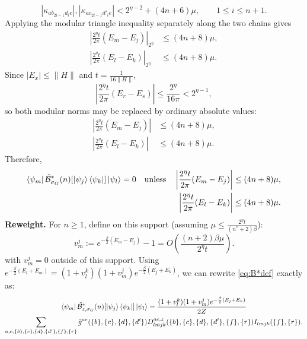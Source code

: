 \documentclass[aps,floatfix,10pt,amssymb,amsfont,amsmath,superscriptaddress,float,nofootinbib,longbibliography,nobalancelastpage,twocolumn]{revtex4-2}
\begin{document}
\begin{equation}
    |\kappa_{ab_{2i-1}d_i e}|,|\kappa_{ac_{2i-1}d'_i e}| < 2^{\eta-2}+(4n+6)\mu,
    \qquad 1\leq i\leq n+1.
    \label{eq:Qkappabound}
\end{equation}
Applying the modular triangle inequality separately along the two chains gives
\begin{equation}
\begin{aligned}
    \left|\frac{2^{\eta}t}{2\pi}(E_m-E_j)\right|_{2^{\eta}}&\leq(4n+8)\mu,\\
    \left|\frac{2^{\eta}t}{2\pi}(E_l-E_k)\right|_{2^{\eta}}&\leq(4n+8)\mu.
\end{aligned}
\end{equation}
Since $|E_x|\leq\|H\|$ and $t=\frac{1}{16\|H\|}$,
\begin{equation*}
    \left|\frac{2^{\eta}t}{2\pi}(E_r-E_s)\right|
    \leq \frac{2^{\eta}}{16\pi}<2^{\eta-1},
\end{equation*}
so both modular norms may be replaced by ordinary absolute values:
\begin{equation}
\label{eq:energiessame}
\begin{aligned}
    \left|\frac{2^{\eta}t}{2\pi}(E_m-E_j)\right|&\leq(4n+8)\mu,\\
    \left|\frac{2^{\eta}t}{2\pi}(E_l-E_k)\right|&\leq(4n+8)\mu.
\end{aligned}
\end{equation}
Therefore,
\begin{equation}
\begin{aligned}
    \bra{\psi_m}\tilde{\mathcal{B}}^*_{\sigma_G}(n)[\ket{\psi_j}\bra{\psi_k}]\ket{\psi_l}=0\quad\text{unless}\quad
    \left|\frac{2^{\eta}t}{2\pi}(E_m-E_j)\right|&\leq(4n+8)\mu,\\
    \left|\frac{2^{\eta}t}{2\pi}(E_l-E_k)\right|&\leq(4n+8)\mu.
    \label{eq:Bsupport}
\end{aligned}
\end{equation}
\textbf{Reweight.} For $n\geq1$, define on this support (assuming $\mu \leq \frac{2^{\eta}t}{(n^*+2)\beta}$):
\begin{equation*}
    v_m^j:=e^{-\frac{\beta}{2}(E_m-E_j)}-1=O(\frac{(n+2)\beta \mu}{2^{\eta}t}).
\end{equation*}
with $v_m^j=0$ outside of this support.
Using $e^{-\frac{\beta}{2}(E_l+E_m)}=(1+v_l^k)(1+v_m^j)e^{-\frac{\beta}{2}(E_j+E_k)}$, we can rewrite \eqref{eq:B*def} exactly as:
\begin{multline}
     \bra{\psi_m}\tilde{\mathcal{B}}^*_{z,\sigma_G}(n)[\ket{\psi_j}\bra{\psi_k}]\ket{\psi_l} = \frac{(1+v_l^k)(1+v_m^j)e^{-\frac{\beta}{2}(E_j+E_k)}}{2Z}\\\sum_{a,e,\{b\},\{c\},\{d\},\{d'\},\{f\},\{r\}} \bar g^{ae}(\{b\},\{c\},\{d\},\{d'\}) D^{ae,z}_{lmjk}(\{b\},\{c\},\{d\},\{d'\},\{f\},\{r\})I_{lmjk}(\{f\},\{r\}).
\end{multline}
\end{document}
